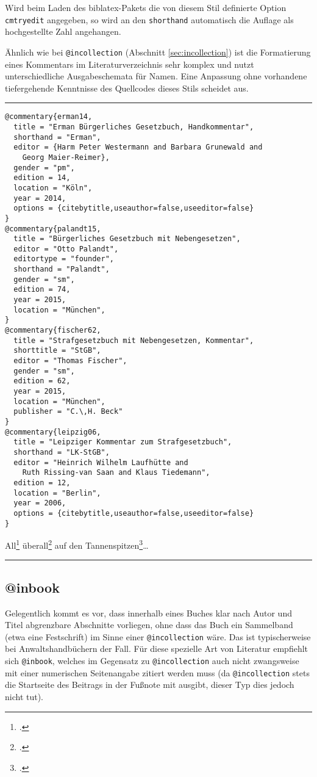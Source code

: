 \documentclass[11pt,a4paper,DIV=calc]{scrartcl}
\newcommand\software[1]{\textsf{#1}}
\newenvironment{rubexample}{\par\vspace{\baselineskip}\hrule\par\begin{refsection}}{\end{refsection}\par\hrule\par\vspace{\baselineskip}}
\begin{document}
Wird beim Laden des \software{biblatex}-Pakets die von diesem Stil
definierte Option \verb+cmtryedit+ angegeben, so wird an den
\verb+shorthand+ automatisch die Auflage als hochgestellte Zahl
angehangen.

Ähnlich wie bei \verb+@incollection+ (Abschnitt
\ref{sec:incollection}) ist die Formatierung eines Kommentars im
Literaturverzeichnis sehr komplex und nutzt unterschiedliche
Ausgabeschemata für Namen. Eine Anpassung ohne vorhandene
tiefergehende Kenntnisse des Quellcodes dieses Stils scheidet aus.

\begin{rubexample}
\begin{verbatim}
@commentary{erman14,
  title = "Erman Bürgerliches Gesetzbuch, Handkommentar",
  shorthand = "Erman",
  editor = {Harm Peter Westermann and Barbara Grunewald and
    Georg Maier-Reimer},
  gender = "pm",
  edition = 14,
  location = "Köln",
  year = 2014,
  options = {citebytitle,useauthor=false,useeditor=false}
}
@commentary{palandt15,
  title = "Bürgerliches Gesetzbuch mit Nebengesetzen",
  editor = "Otto Palandt",
  editortype = "founder",
  shorthand = "Palandt",
  gender = "sm",
  edition = 74,
  year = 2015,
  location = "München",
}
@commentary{fischer62,
  title = "Strafgesetzbuch mit Nebengesetzen, Kommentar",
  shorttitle = "StGB",
  editor = "Thomas Fischer",
  gender = "sm",
  edition = 62,
  year = 2015,
  location = "München",
  publisher = "C.\,H. Beck"
}
@commentary{leipzig06,
  title = "Leipziger Kommentar zum Strafgesetzbuch",
  shorthand = "LK-StGB",
  editor = "Heinrich Wilhelm Laufhütte and
    Ruth Rissing-van Saan and Klaus Tiedemann",
  edition = 12,
  location = "Berlin",
  year = 2006,
  options = {citebytitle,useauthor=false,useeditor=false}
}
\end{verbatim}

All\footcite[Ellenberger][\S\,12 Rnr. 7]{palandt15}
überall\footcite[Grunewald][\S\,12 Rnr. 6]{erman14}
auf den
Tannenspitzen\footcites[][\S\,242 Rnr. 10]{fischer62}[Laufhütte][\S\,242\,Rnr. 15]{leipzig06}\ldots

\printbibliography{}
\end{rubexample}

\subsection{@inbook}

Gelegentlich kommt es vor, dass innerhalb eines Buches klar nach Autor
und Titel abgrenzbare Abschnitte vorliegen, ohne dass das Buch ein
Sammelband (etwa eine Festschrift) im Sinne einer \verb+@incollection+
wäre. Das ist typischerweise bei Anwaltshandbüchern der Fall. Für
diese spezielle Art von Literatur empfiehlt sich \verb+@inbook+,
welches im Gegensatz zu \verb+@incollection+ auch nicht zwangsweise
mit einer numerischen Seitenangabe zitiert werden muss (da
\verb+@incollection+ stets die Startseite des Beitrags in der Fußnote
mit ausgibt, dieser Typ dies jedoch nicht tut).
\end{document}
